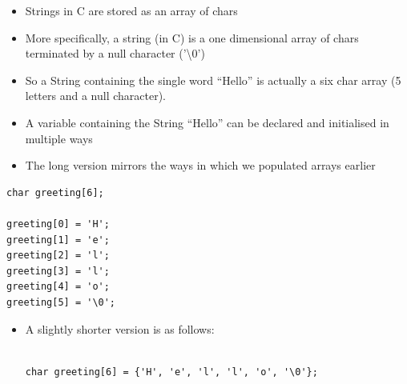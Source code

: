 \documentclass{beamer}
\begin{document}
\begin{frame}
\begin{itemize}

\item {\color{black}
Strings in C are stored as an array of chars}
\item {\color{black}
More specifically, a string (in C) is a one dimensional array of chars terminated by a null character
('{\textbackslash}0')}
\item {\color{black}
So a String containing the single word ``Hello'' is actually a six char array (5 letters and a null character).}

\end{itemize}
\end{frame}


\begin{frame}
\begin{itemize}
\item A variable containing the String ``Hello'' can be declared and initialised in multiple ways
\end{itemize}
\end{frame}

\begin{frame}[fragile]
\begin{itemize}
\item The long version mirrors the ways in which we populated arrays earlier
\end{itemize}

\begin{block}{}
\begin{lstlisting}
char greeting[6];

greeting[0] = 'H';
greeting[1] = 'e';
greeting[2] = 'l';
greeting[3] = 'l';
greeting[4] = 'o';
greeting[5] = '\0';

\end{lstlisting}
\end{block} 
\end{frame}


\begin{frame}[fragile]
\begin{itemize}

\item {\color{black}
A slightly shorter version is as follows:}

\begin{block}{}
\begin{lstlisting}

char greeting[6] = {'H', 'e', 'l', 'l', 'o', '\0'};

\end{lstlisting}
\end{block} 

\end{itemize}
\end{frame}
\end{document}
